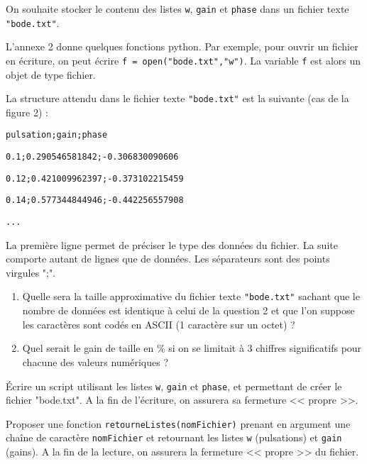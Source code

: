 On souhaite stocker le contenu des listes \texttt{w}, \texttt{gain} et \texttt{phase} dans un fichier texte \texttt{"bode.txt"}.

L'annexe 2 donne quelques fonctions python.
Par exemple, pour ouvrir un fichier en écriture, on peut écrire \texttt{f = open("bode.txt","w")}. La variable \texttt{f} est alors un objet de type fichier.

La structure attendu dans le fichier texte \texttt{"bode.txt"} est la suivante (cas de la figure 2) :

\begin{dBox}
\hspace{0.5 cm} \texttt{pulsation;gain;phase}

\texttt{0.1;0.290546581842;-0.306830090606}

\texttt{0.12;0.421009962397;-0.373102215459}

\texttt{0.14;0.577344844946;-0.442256557908}

\texttt{...}
\end{dBox}

\begin{remark}
La première ligne permet de préciser le type des données du fichier.
La suite comporte autant de lignes que de données. Les séparateurs sont des points virgules ";".
\end{remark}

\begin{tBox}
\question{}
\begin{enumerate}
\item Quelle sera la taille approximative du fichier texte \texttt{"bode.txt"} sachant que le nombre de données est identique à celui de la question 2 et que l'on suppose les caractères sont codés en ASCII (1 caractère sur un octet) ?
\item Quel serait le gain de taille en \% si on se limitait à 3 chiffres significatifs pour chacune des valeurs numériques ?
\end{enumerate}
\end{tBox}

\begin{tBox}
\question{} Écrire un script utilisant les listes \texttt{w}, \texttt{gain} et \texttt{phase}, et permettant de créer le fichier "bode.txt". A la fin de l'écriture, on assurera sa fermeture << propre >>.
\end{tBox}

\begin{tBox}
\question{} Proposer une fonction \texttt{retourneListes(nomFichier)} prenant en argument une chaîne de caractère \texttt{nomFichier} et retournant les listes \texttt{w} (pulsations) et \texttt{gain} (gains). A la fin de la lecture, on assurera la fermeture << propre >> du fichier.
\end{tBox}

